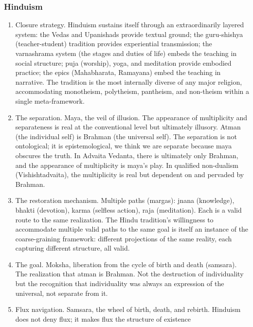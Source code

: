 \documentclass[
]{article}
\providecommand{\tightlist}{%
  \setlength{\itemsep}{0pt}\setlength{\parskip}{0pt}}
\begin{document}
\subsubsection{Hinduism}\label{hinduism}

\begin{enumerate}
\def\labelenumi{\arabic{enumi}.}
\setcounter{enumi}{47}
\tightlist
\item
  Closure strategy. Hinduism sustains itself through an extraordinarily
  layered system: the Vedas and Upanishads provide textual ground; the
  guru-shishya (teacher-student) tradition provides experiential
  transmission; the varnashrama system (the stages and duties of life)
  embeds the teaching in social structure; puja (worship), yoga, and
  meditation provide embodied practice; the epics (Mahabharata,
  Ramayana) embed the teaching in narrative. The tradition is the most
  internally diverse of any major religion, accommodating monotheism,
  polytheism, pantheism, and non-theism within a single meta-framework.
\item
  The separation. Maya, the veil of illusion. The appearance of
  multiplicity and separateness is real at the conventional level but
  ultimately illusory. Atman (the individual self) is Brahman (the
  universal self). The separation is not ontological; it is
  epistemological, we think we are separate because maya obscures the
  truth. In Advaita Vedanta, there is ultimately only Brahman, and the
  appearance of multiplicity is maya's play. In qualified non-dualism
  (Vishishtadvaita), the multiplicity is real but dependent on and
  pervaded by Brahman.
\item
  The restoration mechanism. Multiple paths (margas): jnana (knowledge),
  bhakti (devotion), karma (selfless action), raja (meditation). Each is
  a valid route to the same realization. The Hindu tradition's
  willingness to accommodate multiple valid paths to the same goal is
  itself an instance of the coarse-graining framework: different
  projections of the same reality, each capturing different structure,
  all valid.
\item
  The goal. Moksha, liberation from the cycle of birth and death
  (samsara). The realization that atman is Brahman. Not the destruction
  of individuality but the recognition that individuality was always an
  expression of the universal, not separate from it.
\item
  Flux navigation. Samsara, the wheel of birth, death, and rebirth.
  Hinduism does not deny flux; it makes flux the structure of existence

\end{enumerate}
\end{document}
